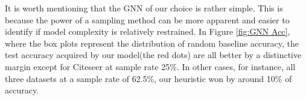 It is worth mentioning that the GNN of our choice is rather simple. This is because the power of a sampling method can be more apparent and easier to identify if model complexity is relatively restrained. In Figure \ref{fig:GNN Acc}, where the box plots represent the distribution of random baseline accuracy, the test accuracy acquired by our model(the red dots) are all better by a distinctive margin except for Citeseer at sample rate 25\%. In other cases, for instance, all three datasets at a sample rate of 62.5\%, our heuristic won by around 10\% of accuracy.